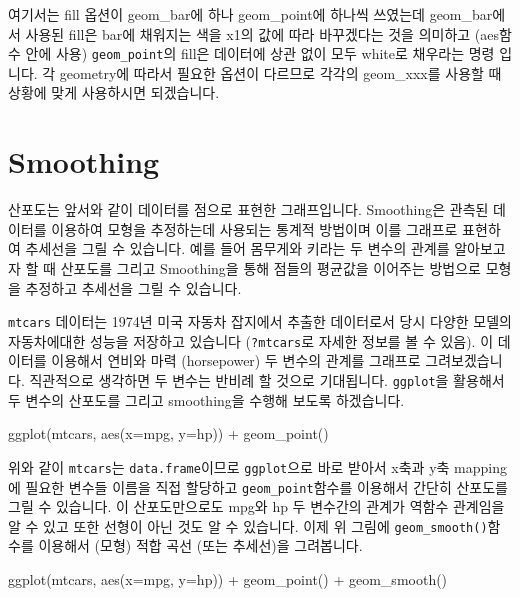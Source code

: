 \documentclass[
]{book}
\newenvironment{Shaded}{\begin{snugshade}}{\end{snugshade}}
\newcommand{\AttributeTok}[1]{\textcolor[rgb]{0.77,0.63,0.00}{#1}}
\newcommand{\FunctionTok}[1]{\textcolor[rgb]{0.00,0.00,0.00}{#1}}
\newcommand{\NormalTok}[1]{#1}
\newcommand{\SpecialCharTok}[1]{\textcolor[rgb]{0.00,0.00,0.00}{#1}}
\begin{document}
여기서는 fill 옵션이 geom\_bar에 하나 geom\_point에 하나씩 쓰였는데 geom\_bar에서 사용된 fill은 bar에 채워지는 색을 x1의 값에 따라 바꾸겠다는 것을 의미하고 (aes함수 안에 사용) \texttt{geom\_point}의 fill은 데이터에 상관 없이 모두 white로 채우라는 명령 입니다. 각 geometry에 따라서 필요한 옵션이 다르므로 각각의 geom\_xxx를 사용할 때 상황에 맞게 사용하시면 되겠습니다.

\hypertarget{smoothing}{%
\section{Smoothing}\label{smoothing}}

산포도는 앞서와 같이 데이터를 점으로 표현한 그래프입니다. Smoothing은 관측된 데이터를 이용하여 모형을 추정하는데 사용되는 통계적 방법이며 이를 그래프로 표현하여 추세선을 그릴 수 있습니다. 예를 들어 몸무게와 키라는 두 변수의 관계를 알아보고자 할 때 산포도를 그리고 Smoothing을 통해 점들의 평균값을 이어주는 방법으로 모형을 추정하고 추세선을 그릴 수 있습니다.

\texttt{mtcars} 데이터는 1974년 미국 자동차 잡지에서 추출한 데이터로서 당시 다양한 모델의 자동차에대한 성능을 저장하고 있습니다 (\texttt{?mtcars}로 자세한 정보를 볼 수 있음). 이 데이터를 이용해서 연비와 마력 (horsepower) 두 변수의 관계를 그래프로 그려보겠습니다. 직관적으로 생각하면 두 변수는 반비례 할 것으로 기대됩니다. \texttt{ggplot}을 활용해서 두 변수의 산포도를 그리고 smoothing을 수행해 보도록 하겠습니다.

\begin{Shaded}
\begin{Highlighting}[]
\FunctionTok{ggplot}\NormalTok{(mtcars, }\FunctionTok{aes}\NormalTok{(}\AttributeTok{x=}\NormalTok{mpg, }\AttributeTok{y=}\NormalTok{hp)) }\SpecialCharTok{+}
  \FunctionTok{geom\_point}\NormalTok{()}
\end{Highlighting}
\end{Shaded}

위와 같이 \texttt{mtcars}는 \texttt{data.frame}이므로 \texttt{ggplot}으로 바로 받아서 x축과 y축 mapping에 필요한 변수들 이름을 직접 할당하고 \texttt{geom\_point}함수를 이용해서 간단히 산포도를 그릴 수 있습니다. 이 산포도만으로도 mpg와 hp 두 변수간의 관계가 역함수 관계임을 알 수 있고 또한 선형이 아닌 것도 알 수 있습니다. 이제 위 그림에 \texttt{geom\_smooth()}함수를 이용해서 (모형) 적합 곡선 (또는 추세선)을 그려봅니다.

\begin{Shaded}
\begin{Highlighting}[]
\FunctionTok{ggplot}\NormalTok{(mtcars, }\FunctionTok{aes}\NormalTok{(}\AttributeTok{x=}\NormalTok{mpg, }\AttributeTok{y=}\NormalTok{hp)) }\SpecialCharTok{+}
  \FunctionTok{geom\_point}\NormalTok{() }\SpecialCharTok{+}
  \FunctionTok{geom\_smooth}\NormalTok{()}
\end{Highlighting}
\end{Shaded}
\end{document}
